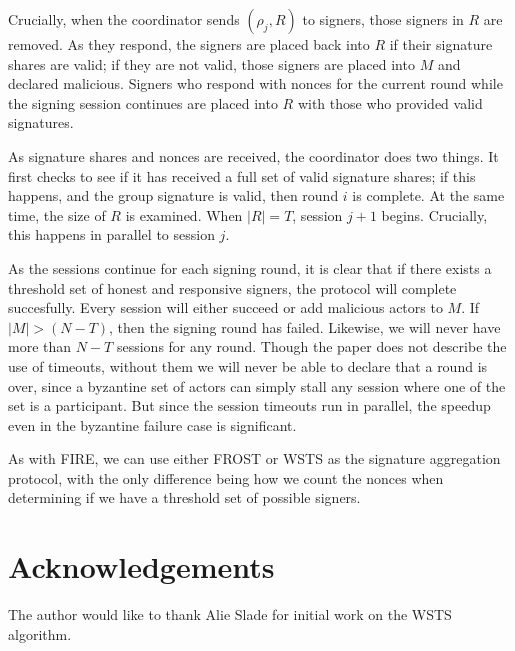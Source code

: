 \documentclass{article}
\begin{document}
Crucially, when the coordinator sends $(\rho_j, R)$ to signers, those signers in $R$ are removed.  As they respond, the signers are placed back into $R$ if their signature shares are valid; if they are not valid, those signers are placed into $M$ and declared malicious.  Signers who respond with nonces for the current round while the signing session continues are placed into $R$ with those who provided valid signatures.

As signature shares and nonces are received, the coordinator does two things.  It first checks to see if it has received a full set of valid signature shares; if this happens, and the group signature is valid, then round $i$ is complete.  At the same time, the size of $R$ is examined.  When $|R| = T$, session $j+1$ begins.  Crucially, this happens in parallel to session $j$.

As the sessions continue for each signing round, it is clear that if there exists a threshold set of honest and responsive signers, the protocol will complete succesfully.  Every session will either succeed or add malicious actors to $M$.  If $|M| > (N-T)$, then the signing round has failed.  Likewise, we will never have more than $N-T$ sessions for any round.  Though the paper does not describe the use of timeouts, without them we will never be able to declare that a round is over, since a byzantine set of actors can simply stall any session where one of the set is a participant.  But since the session timeouts run in parallel, the speedup even in the byzantine failure case is significant.

As with FIRE, we can use either FROST or WSTS as the signature aggregation protocol, with the only difference being how we count the nonces when determining if we have a threshold set of possible signers.

\section{
  Acknowledgements
}

The author would like to thank Alie Slade for initial work on the WSTS algorithm.
\end{document}
